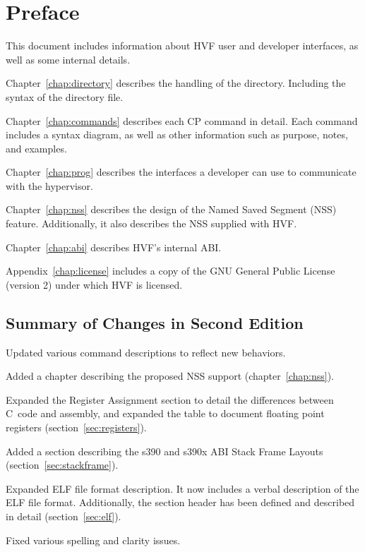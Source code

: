 \chapter*{Preface}
This document includes information about HVF user and developer interfaces,
as well as some internal details.

Chapter~\ref{chap:directory} describes the handling of the directory.
Including the syntax of the directory file.

Chapter~\ref{chap:commands} describes each CP command in detail.  Each
command includes a syntax diagram, as well as other information such as
purpose, notes, and examples.

Chapter~\ref{chap:prog} describes the interfaces a developer can use to
communicate with the hypervisor.

\cbstart
Chapter~\ref{chap:nss} describes the design of the Named Saved Segment (NSS)
feature.  Additionally, it also describes the NSS supplied with HVF.
\cbend

Chapter~\ref{chap:abi} describes HVF's internal ABI.

Appendix~\ref{chap:license} includes a copy of the GNU General Public
License (version 2) under which HVF is licensed.

\cbstart
\section*{Summary of Changes in Second Edition}
Updated various command descriptions to reflect new behaviors.

Added a chapter describing the proposed NSS support (chapter~\ref{chap:nss}).

Expanded the Register Assignment section to detail the differences between
C~code and assembly, and expanded the table to document floating point
registers (section~\ref{sec:registers}).

Added a section describing the s390 and s390x ABI Stack Frame Layouts
(section~\ref{sec:stackframe}).

Expanded ELF file format description.  It now includes a verbal description
of the ELF file format.  Additionally, the section header has been defined
and described in detail (section~\ref{sec:elf}).

Fixed various spelling and clarity issues.
\cbend
